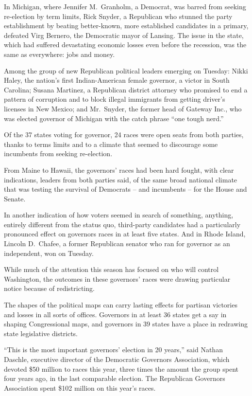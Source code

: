 ﻿\documentclass[12pt]{article}
\begin{document}
In Michigan, where Jennifer M.~Granholm, a Democrat, was barred from seeking re-election by term
limits, Rick Snyder, a Republican who stunned the party establishment by beating better-known, more
established candidates in a primary, defeated Virg Bernero, the Democratic mayor of Lansing. The
issue in the state, which had suffered devastating economic losses even before the recession, was
the same as everywhere: jobs and money.

Among the group of new Republican political leaders emerging on Tuesday: Nikki Haley, the nation's
first Indian-American female governor, a victor in South Carolina; Susana Martinez, a Republican
district attorney who promised to end a pattern of corruption and to block illegal immigrants from
getting driver's licenses in New Mexico; and Mr.~Snyder, the former head of Gateway Inc., who was
elected governor of Michigan with the catch phrase ``one tough nerd.''

Of the 37 states voting for governor, 24 races were open seats from both parties, thanks to terms
limits and to a climate that seemed to discourage some incumbents from seeking re-election.

From Maine to Hawaii, the governors' races had been hard fought, with clear indications, leaders
from both parties said, of the same broad national climate that was testing the survival of
Democrats -- and incumbents -- for the House and Senate.

In another indication of how voters seemed in search of something, anything, entirely different from
the status quo, third-party candidates had a particularly pronounced effect on governors races in at
least five states. And in Rhode Island, Lincoln D.~Chafee, a former Republican senator who ran for
governor as an independent, won on Tuesday.

While much of the attention this season has focused on who will control Washington, the outcomes in
these governors' races were drawing particular notice because of redistricting.

The shapes of the political maps can carry lasting effects for partisan victories and losses in all
sorts of offices. Governors in at least 36 states get a say in shaping Congressional maps, and
governors in 39 states have a place in redrawing state legislative districts.

``This is the most important governors' election in 20 years,'' said Nathan Daschle, executive
director of the Democratic Governors Association, which devoted \$50 million to races this year,
three times the amount the group spent four years ago, in the last comparable election. The
Republican Governors Association spent \$102 million on this year's races.
\end{document}
